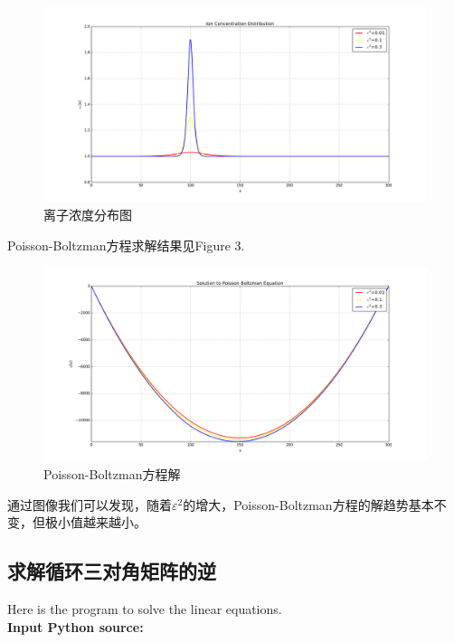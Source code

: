 \documentclass[twoside,twocolumn]{article}
\begin{document}
\begin{CJK*}{UTF8}{gkai}
\begin{figure}[h]
\centering
\includegraphics[width=1.0\linewidth]{figure/figure2}
\caption{离子浓度分布图}
\label{fig:figure2}
\end{figure}

Poisson-Boltzman方程求解结果见Figure 3.
\begin{figure}[h]
\centering
\includegraphics[width=1.0\linewidth]{figure/figure3}
\caption{Poisson-Boltzman方程解}
\label{fig:figure3}
\end{figure}
通过图像我们可以发现，随着$\varepsilon^{2}$的增大，Poisson-Boltzman方程的解趋势基本不变，但极小值越来越小。


\newpage
\onecolumn
\begin{appendices}

\section{求解循环三对角矩阵的逆}
Here is the program to solve the linear equations.\\
\textbf{\textcolor[rgb]{0.98,0.00,0.00}{Input Python source:}}

\newpage

\end{appendices}
\end{CJK*}
\end{document}
